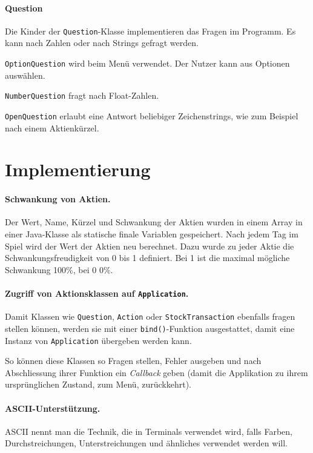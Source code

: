 \documentclass[paper=a4, fontsize=11pt]{article}
\numberwithin{equation}{section}		%
\numberwithin{figure}{section}			%
\numberwithin{table}{section}				%
\begin{document}
	\paragraph{Question}
	
	Die Kinder der \texttt{Question}-Klasse implementieren das Fragen im Programm. Es kann nach Zahlen oder nach Strings gefragt werden.
	
	\texttt{OptionQuestion} wird beim Menü verwendet. Der Nutzer kann aus Optionen auswählen.
	
	\texttt{NumberQuestion} fragt nach Float-Zahlen.
	
	\texttt{OpenQuestion} erlaubt eine Antwort beliebiger Zeichenstrings, wie zum Beispiel nach einem Aktienkürzel.
	
	\section{Implementierung}
	
	\paragraph{Schwankung von Aktien.} Der Wert, Name, Kürzel und Schwankung der Aktien wurden in einem Array in einer Java-Klasse als statische finale Variablen gespeichert. Nach jedem Tag im Spiel wird der Wert der Aktien neu berechnet. Dazu wurde zu jeder Aktie die Schwankungsfreudigkeit von 0 bis 1 definiert. Bei 1 ist die maximal mögliche Schwankung 100\%, bei 0 0\%.
	
	\paragraph{Zugriff von Aktionsklassen auf \texttt{Application}.} Damit Klassen wie \texttt{Question}, \texttt{Action} oder \texttt{StockTransaction} ebenfalls fragen stellen können, werden sie mit einer \texttt{bind()}-Funktion ausgestattet, damit eine Instanz von \texttt{Application} übergeben werden kann.
	
	So können diese Klassen so Fragen stellen, Fehler ausgeben und nach Abschliessung ihrer Funktion ein \textit{Callback} geben (damit die Applikation zu ihrem ursprünglichen Zustand, zum Menü, zurückkehrt).
	
	\paragraph{ASCII-Unterstützung.} ASCII nennt man die Technik, die in Terminals verwendet wird, falls Farben, Durchstreichungen, Unterstreichungen und ähnliches verwendet werden will.
	
\end{document}
